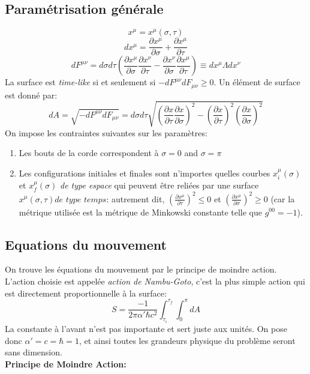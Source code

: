 \documentclass[a4paper,12pt]{article}
\def\xmu{x^\mu}
\begin{document}
\subsection{Paramétrisation générale}
$$x^{\mu}=x^{\mu}(\sigma,\tau)$$
$$dx^{\mu}=\frac{\partial \xmu}{\partial \sigma}+\frac{\partial x^{\mu}}{\partial \tau}$$
$$dF^{\mu \nu}=d\sigma d\tau \left( \frac{\partial \xmu}{\partial \sigma}\frac{\partial x^{\nu}}{\partial \tau}-\frac{\partial x^{\nu}}{\partial \sigma}\frac{\partial x^{\mu}}{\partial \tau}\right)\equiv dx^{\mu}\Lambda dx^{\nu}$$
La surface est \textit{time-like} si et seulement si $-dF^{\mu \nu}dF_{\mu \nu}\geq0$.
Un élément de surface est donné par:
$$dA=\sqrt{-dF^{\mu \nu}dF_{\mu \nu}}=d\sigma d\tau \sqrt{\left( \frac{\partial x}{\partial \tau}\frac{\partial x}{\partial \sigma}\right)^{2}-\left( \frac{\partial x}{\partial \tau}\right) ^{2}\left( \frac{\partial x}{\partial \sigma}\right) ^{2}}$$
On impose les contraintes suivantes sur les paramètres:
\begin{enumerate}
\item Les bouts de la corde correspondent à $\sigma=0$ and $\sigma=\pi$
\item Les configurations initiales et finales sont n'importes quelles courbes $x^{\mu}_{i}(\sigma)$ et $x^{\mu}_{f}(\sigma)$  \textit{de type espace} qui peuvent être reliées par une surface $x^{\mu}(\sigma,\tau) \textit{de type temps}$:
autrement dit, $\left( \frac{\partial x^{\mu}}{\partial \tau}\right)^{2}\leq 0 $ et $\left( \frac{\partial x^{\mu}}{\partial \sigma}\right)^{2}\geq 0 $ (car la métrique utilisée est la métrique de Minkowski constante telle que $g^{00}=-1$).
\end{enumerate}
\subsection{Equations du mouvement}
On trouve les équations du mouvement par le principe de moindre action. L'action choisie est appelée \textit{action de Nambu-Goto}, c'est la plus simple action qui est directement proportionnelle à la surface:
\begin{equation}
S=\frac{-1}{2\pi \alpha'\hbar c^{2}}\int_{\tau_{i}}^{\tau_{f}}\int_{0}^{\pi}dA
\end{equation} 
La constante à l'avant n'est pas importante et sert juste aux unités. On pose donc $\alpha '=c=\hbar =1$, et ainsi toutes les grandeurs physique du problème seront sans dimension.\\
\textbf{Principe de Moindre Action:} 
\end{document}
